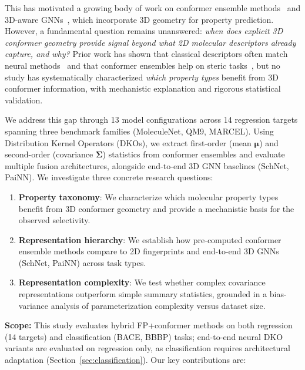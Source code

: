 \documentclass[sigconf]{acmart}
\newcommand{\rev}[1]{#1}
\begin{document}
This has motivated a growing body of work on conformer ensemble methods~\cite{axelrod2024marcel,ganea2021geomol,stark2022equivariant} and 3D-aware GNNs~\cite{schutt2017schnet,gasteiger2020dimenet,schutt2021painn}, which incorporate 3D geometry for property prediction. However, a fundamental question remains unanswered: \emph{when does explicit 3D conformer geometry provide signal beyond what 2D molecular descriptors already capture, and why?} Prior work has shown that classical descriptors often match neural methods~\cite{wu2018moleculenet} and that conformer ensembles help on steric tasks~\cite{axelrod2024marcel}, but no study has systematically characterized \emph{which property types} benefit from 3D conformer information, with mechanistic explanation and rigorous statistical validation.

We address this gap through 13 model configurations across 14 regression targets spanning three benchmark families (MoleculeNet, QM9, MARCEL). Using Distribution Kernel Operators (DKOs), we extract first-order (mean $\boldsymbol{\mu}$) and second-order (covariance $\boldsymbol{\Sigma}$) statistics from conformer ensembles and evaluate multiple fusion architectures, alongside end-to-end 3D GNN baselines \rev{(SchNet, PaiNN)}.
We investigate three concrete research questions:
\begin{enumerate}[label=\textbf{RQ\arabic*.}, leftmargin=*, itemsep=0pt]
    \item \rev{\textbf{Property taxonomy}: We characterize which molecular property types benefit from 3D conformer geometry and provide a mechanistic basis for the observed selectivity.}
    \item \rev{\textbf{Representation hierarchy}: We establish how pre-computed conformer ensemble methods compare to 2D fingerprints and end-to-end 3D GNNs (SchNet, PaiNN) across task types.}
    \item \rev{\textbf{Representation complexity}: We test whether complex covariance representations outperform simple summary statistics, grounded in a bias-variance analysis of parameterization complexity versus dataset size.}
\end{enumerate}
\rev{\textbf{Scope:} This study evaluates hybrid FP+conformer methods on both regression (14 targets) and classification (BACE, BBBP) tasks; end-to-end neural DKO variants are evaluated on regression only, as classification requires architectural adaptation (Section~\ref{sec:classification}).}
Our key contributions are:
\end{document}
